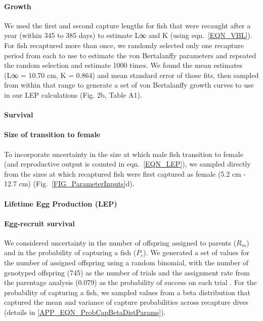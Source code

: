 \documentclass[12pt, oneside]{article}   	%
\begin{document}
\paragraph{Growth} \label{APP_SEC_Uncertainty_Growth}

We used the first and second capture lengths for fish that were recaught after a year (within 345 to 385 days) to estimate L∞ and K (using eqn.\ \ref{EQN_VBL}). For fish recaptured more than once, we randomly selected only one recapture period from each to use to estimate the von Bertalanffy parameters and repeated the random selection and estimate 1000 times. We found the mean estimates (L∞ = 10.70 cm, K = 0.864) and mean standard error of those fits, then sampled from within that range to generate a set of von Bertalanffy growth curves to use in our LEP calculations (Fig. 2b, Table A1).

\paragraph{Survival} \label{APP_SEC_Uncertainty_Survival}

\paragraph{Size of transition to female} \label{APP_SEC_Uncertainty_FemaleSize}

 To incorporate uncertainty in the size at which male fish transition to female (and reproductive output is counted in eqn.\ \ref{EQN_LEP}), we sampled directly from the sizes at which recaptured fish were first captured as female (5.2 cm - 12.7 cm) (Fig.\ \ref{FIG_ParameterInputs}d).

\paragraph{Lifetime Egg Production (LEP)} \label{APP_SEC_Uncertainty_LEP}

\paragraph{Egg-recruit survival} \label{APP_SEC_Uncertainty_Egg-recruit-surv}

We considered uncertainty in the number of offspring assigned to parents ($R_m$) and in the probability of capturing a fish ($P_c$). We generated a set of values for the number of assigned offspring using a random binomial, with the number of genotyped offspring (745) as the number of trials and the assignment rate from the parentage analysis (0.079) as the probability of success on each trial \citep{catalanoInPrepconnectivity}. For the probability of capturing a fish, we sampled values from a beta distribution that captured the mean and variance of capture probabilities across recapture dives (details in \ref{APP_EQN_ProbCapBetaDistParams}).
\end{document}
